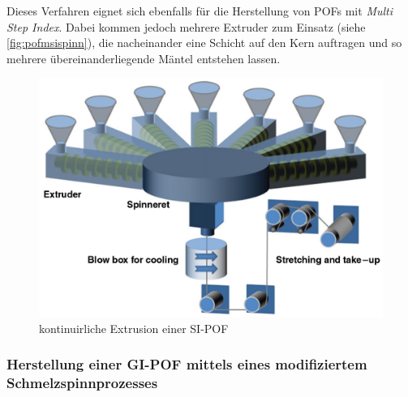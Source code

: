 Dieses Verfahren eignet sich ebenfalls für die Herstellung von POFs mit
\textit{Multi Step Index}. Dabei kommen jedoch mehrere Extruder zum Einsatz
(siehe \autoref{fig:pofmsispinn}), die nacheinander eine Schicht auf den Kern
auftragen und so mehrere übereinanderliegende Mäntel entstehen lassen.
\cite{pofspinn}

\begin{figure}[h]
    \begin{center}
        \begin{minipage}[t]{\textwidth}
            \begin{center}
                \includegraphics[height=0.25\textheight]{Bilder/Optische_Wellenleiter_Die_Polymer_Optische_Faser/Herstellung/pofmsispinn.png}
                \caption[kontinuirliche Extrusion einer SI-POF \newline \url{http://www.researchgate.net/publication/265646639_An_overview_on_fabrication_methods_for_polymer_optical_fibers} S. 5 (zuletzt aufgerufen am 28.09.2015)]{kontinuirliche Extrusion einer SI-POF}
                \label{fig:pofmsispinn}
            \end{center}
        \end{minipage}
    \end{center}
\end{figure}

\subsubsection{Herstellung einer GI-POF mittels eines modifiziertem Schmelzspinnprozesses}

